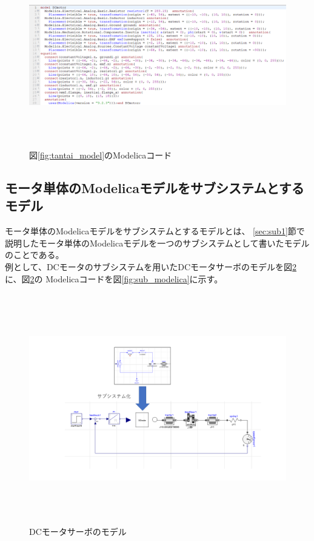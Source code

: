 \begin{figure}[t]
	\centering
	\includegraphics[width=16.5cm,height=8cm]{./Image/tantai_modelica.png}
	\caption{図\ref{fig:tantai_model}のModelicaコード}
	\label{fig:tantai_modelica}
  \end{figure}


\subsection{モータ単体のModelicaモデルをサブシステムとするモデル}\label{sec:sub2}
モータ単体のModelicaモデルをサブシステム\cite{modelicaシステム本}とするモデルとは、
\ref{sec:sub1}節で説明したモータ単体のModelicaモデルを一つのサブシステムとして書いたモデルのことである。\\
例として、DCモータのサブシステムを用いたDCモータサーボのモデルを図\ref{fig:submodel}に、図\ref{fig:submodel}の
Modelicaコードを図\ref{fig:sub_modelica}に示す。

\begin{figure}[t]
	\centering
	\includegraphics[width=16.5cm,height=10cm]{./Image/submodel_pack.png}
	\caption{DCモータサーボのモデル}
	\label{fig:submodel}
  \end{figure}

